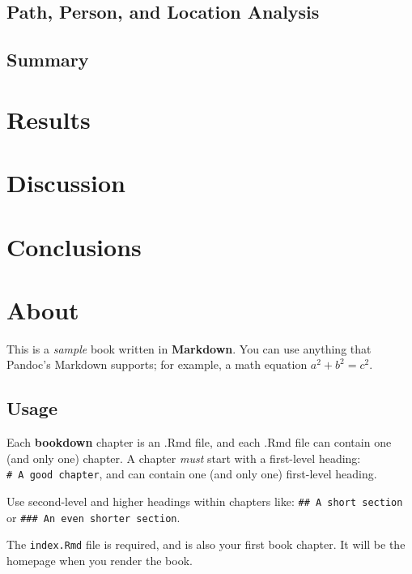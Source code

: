 \documentclass[12pt, oneside, openright]{byuthesis}
\begin{document}
\hypertarget{mcomp}{%
\section{Path, Person, and Location Analysis}\label{mcomp}}

\hypertarget{summary-1}{%
\section{Summary}\label{summary-1}}

\hypertarget{results}{%
\chapter{Results}\label{results}}

\hypertarget{discussion}{%
\chapter{Discussion}\label{discussion}}

\hypertarget{conclusions}{%
\chapter{Conclusions}\label{conclusions}}

\hypertarget{about}{%
\chapter{About}\label{about}}

This is a \emph{sample} book written in \textbf{Markdown}. You can use anything that Pandoc's Markdown supports; for example, a math equation \(a^2 + b^2 = c^2\).

\hypertarget{usage}{%
\section{Usage}\label{usage}}

Each \textbf{bookdown} chapter is an .Rmd file, and each .Rmd file can contain one (and only one) chapter. A chapter \emph{must} start with a first-level heading: \texttt{\#\ A\ good\ chapter}, and can contain one (and only one) first-level heading.

Use second-level and higher headings within chapters like: \texttt{\#\#\ A\ short\ section} or \texttt{\#\#\#\ An\ even\ shorter\ section}.

The \texttt{index.Rmd} file is required, and is also your first book chapter. It will be the homepage when you render the book.
\end{document}

